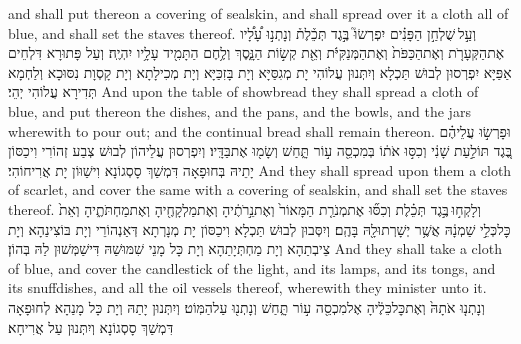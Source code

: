 {and shall put thereon a covering of sealskin, and shall spread over it a cloth all of blue, and shall set the staves thereof.}{}
{וְעַ֣ל \legarmeh  שֻׁלְחַ֣ן הַפָּנִ֗ים יִפְרְשׂוּ֮ בֶּ֣גֶד תְּכֵ֒לֶת֒ וְנָתְנ֣וּ עָ֠לָ֠יו אֶת\maqqaf הַקְּעָרֹ֤ת וְאֶת\maqqaf הַכַּפֹּת֙ וְאֶת\maqqaf הַמְּנַקִּיֹּ֔ת וְאֵ֖ת קְשׂ֣וֹת הַנָּ֑סֶךְ וְלֶ֥חֶם הַתָּמִ֖יד עָלָ֥יו יִהְיֶֽה׃}
{וְעַל פָּתוּרָא דִּלְחֵים אַפַּיָּא יִפְרְסוּן לְבוּשׁ תַּכְלָא וְיִתְּנוּן עֲלוֹהִי יָת מְגִסַּיָּא וְיָת בָּזִכַּיָּא וְיָת מְכִילָתָא וְיָת קָסְוָת נִסּוּכָא וְלַחְמָא תְּדִירָא עֲלוֹהִי יְהֵי׃}
{And upon the table of showbread they shall spread a cloth of blue, and put thereon the dishes, and the pans, and the bowls, and the jars wherewith to pour out; and the continual bread shall remain thereon.}{}
{וּפָרְשׂ֣וּ עֲלֵיהֶ֗ם בֶּ֚גֶד תּוֹלַ֣עַת שָׁנִ֔י וְכִסּ֣וּ אֹת֔וֹ בְּמִכְסֵ֖ה ע֣וֹר תָּ֑חַשׁ וְשָׂמ֖וּ אֶת\maqqaf בַּדָּֽיו׃}
{וְיִפְרְסוּן עֲלֵיהוֹן לְבוּשׁ צְבַע זְהוֹרִי וִיכַסּוֹן יָתֵיהּ בְּחוּפָאָה דִּמְשַׁךְ סָסְגוֹנָא וִישַׁוּוֹן יָת אֲרִיחוֹהִי׃}
{And they shall spread upon them a cloth of scarlet, and cover the same with a covering of sealskin, and shall set the staves thereof.}{}
{וְלָקְח֣וּ \legarmeh  בֶּ֣גֶד תְּכֵ֗לֶת וְכִסּ֞וּ אֶת\maqqaf מְנֹרַ֤ת הַמָּאוֹר֙ וְאֶת\maqqaf נֵ֣רֹתֶ֔יהָ וְאֶת\maqqaf מַלְקָחֶ֖יהָ וְאֶת\maqqaf מַחְתֹּתֶ֑יהָ וְאֵת֙ כׇּל\maqqaf כְּלֵ֣י שַׁמְנָ֔הּ אֲשֶׁ֥ר יְשָׁרְתוּ\maqqaf לָ֖הּ בָּהֶֽם׃}
{וְיִסְּבוּן לְבוּשׁ תַּכְלָא וִיכַסּוֹן יָת מְנָרְתָא דְּאַנְהוֹרֵי וְיָת בּוֹצִינַהָא וְיָת צֵיבְתַהָא וְיָת מַחְתְּיָתַהָא וְיָת כָּל מָנֵי שִׁמּוּשַׁהּ דִּישַׁמְּשׁוּן לַהּ בְּהוֹן׃}
{And they shall take a cloth of blue, and cover the candlestick of the light, and its lamps, and its tongs, and its snuffdishes, and all the oil vessels thereof, wherewith they minister unto it.}{}
{וְנָתְנ֤וּ אֹתָהּ֙ וְאֶת\maqqaf כׇּל\maqqaf כֵּלֶ֔יהָ אֶל\maqqaf מִכְסֵ֖ה ע֣וֹר תָּ֑חַשׁ וְנָתְנ֖וּ עַל\maqqaf הַמּֽוֹט׃}
{וְיִתְּנוּן יָתַהּ וְיָת כָּל מָנַהָא לְחוּפָאָה דִּמְשַׁךְ סָסְגוֹנָא וְיִתְּנוּן עַל אֲרִיחָא׃}
